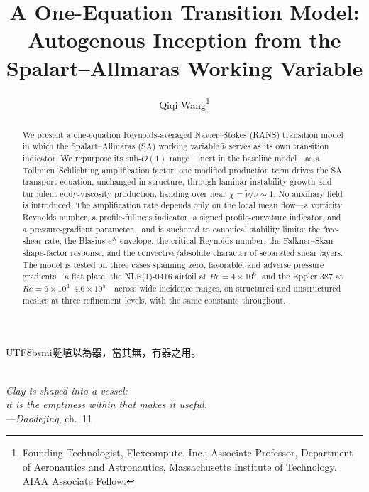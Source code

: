 \documentclass[journal]{new-aiaa}
\title{A One-Equation Transition Model: Autogenous Inception from the
Spalart--Allmaras Working Variable}
\author[1,2]{Qiqi Wang\footnote{Founding Technologist, Flexcompute, Inc.;
Associate Professor, Department of Aeronautics and Astronautics, Massachusetts
Institute of Technology. AIAA Associate Fellow.}}
\affil[1]{Flexcompute, Inc.}
\affil[2]{Department of Aeronautics and Astronautics, Massachusetts Institute of Technology}
\begin{document}
\maketitle

\begin{abstract}
We present a one-equation Reynolds-averaged Navier--Stokes (RANS) transition
model in which the Spalart--Allmaras (SA) working variable $\tilde\nu$ serves as
its own transition indicator. We repurpose its sub-$O(1)$ range---inert in the
baseline model---as a Tollmien--Schlichting amplification factor: one modified
production term drives the SA transport equation, unchanged in structure,
through laminar instability growth and turbulent eddy-viscosity production,
handing over near $\chi\!=\!\tilde\nu/\nu\!\sim\!1$. No auxiliary field is
introduced. The amplification rate depends only on the local mean
flow---a vorticity Reynolds number, a profile-fullness indicator, a
signed profile-curvature indicator, and a
pressure-gradient parameter---and
is anchored to canonical stability limits: the free-shear rate, the
Blasius $e^N$ envelope, the critical Reynolds number, the Falkner--Skan
shape-factor response, and the convective/absolute character of
separated shear layers. The
model is tested on three cases spanning zero, favorable, and adverse
pressure gradients---a flat plate, the NLF(1)-0416 airfoil at
$Re\!=\!4\!\times\!10^6$, and the Eppler 387 at
$Re\!=\!6\!\times\!10^4$--$4.6\!\times\!10^5$---across wide incidence ranges,
on structured and unstructured meshes at three refinement levels, with
the same constants throughout.
\end{abstract}

\begin{center}
  \begin{minipage}{0.6\textwidth}\centering
  \begin{CJK}{UTF8}{bsmi}埏埴以為器，當其無，有器之用。\end{CJK}\\[3pt]
  \emph{Clay is shaped into a vessel:\\
  it is the emptiness within that makes it useful.}\\[3pt]
  ---\emph{Daodejing}, ch.~11
  \end{minipage}
\end{center}
\end{document}
